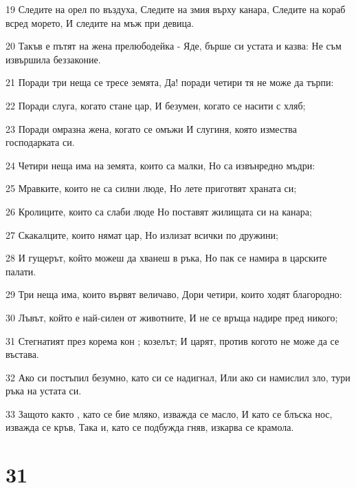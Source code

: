 \par 19 Следите на орел по въздуха, Следите на змия върху канара, Следите на кораб всред морето, И следите на мъж при девица.
\par 20 Такъв е пътят на жена прелюбодейка - Яде, бърше си устата и казва: Не съм извършила беззаконие.
\par 21 Поради три неща се тресе земята, Да! поради четири тя не може да търпи:
\par 22 Поради слуга, когато стане цар, И безумен, когато се насити с хляб;
\par 23 Поради омразна жена, когато се омъжи И слугиня, която измества господарката си.
\par 24 Четири неща има на земята, които са малки, Но са извънредно мъдри:
\par 25 Мравките, които не са силни люде, Но лете приготвят храната си;
\par 26 Кролиците, които са слаби люде Но поставят жилищата си на канара;
\par 27 Скакалците, които нямат цар, Но излизат всички по дружини;
\par 28 И гущерът, който можеш да хванеш в ръка, Но пак се намира в царските палати.
\par 29 Три неща има, които вървят величаво, Дори четири, които ходят благородно:
\par 30 Лъвът, който е най-силен от животните, И не се връща надире пред никого;
\par 31 Стегнатият през корема кон ; козелът; И царят, против когото не може да се въстава.
\par 32 Ако си постъпил безумно, като си се надигнал, Или ако си намислил зло, тури ръка на устата си.
\par 33 Защото както , като се бие мляко, изважда се масло, И като се блъска нос, изважда се кръв, Така и, като се подбужда гняв, изкарва се крамола.

\chapter{31}

